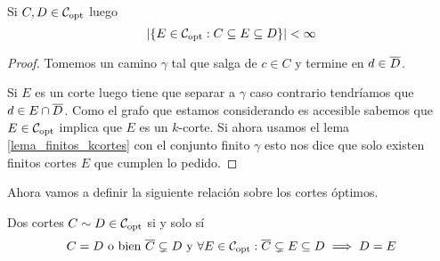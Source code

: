 \documentclass[tesis.tex]{subfiles}
\begin{document}
\begin{lema}\label{lema_intermedios}
	Si $C,D \in {\cal C}_{\text{opt}}$ luego 
	\[
	|\{ E \in {\cal C}_{\text{opt}} : C \subseteq E \subseteq D \}| < \infty
	\]
\end{lema}
\begin{proof}
	Tomemos un camino $\gamma$ tal que salga de $c \in C$ y termine en $d \in \overline D$.
	
	Si $E$ es un corte luego tiene que separar a $\gamma$ caso contrario tendríamos que $d \in E \cap \overline D$.
	Como el grafo que estamos considerando es accesible sabemos que $E \in {\cal C}_{\text{opt}}$ implica que $E$ es un $k$-corte.
	Si ahora usamos el lema \ref{lema_finitos_kcortes} con el conjunto finito $\gamma$ esto nos dice que solo existen finitos cortes $E$ que cumplen lo pedido.
\end{proof}

Ahora vamos a definir la siguiente relación sobre los cortes óptimos.

\begin{deff}
	Dos cortes $C \sim D \in {\cal C}_{\text{opt}}$ si y solo sí
	\[
		C = D \ \text{o bien} \ \overline C \subsetneq D \ \text{y} \ \forall E \in {\cal C}_{\text{opt}} : \overline C \subsetneq E \subseteq D \implies D = E
	\]
\end{deff}
\end{document}
